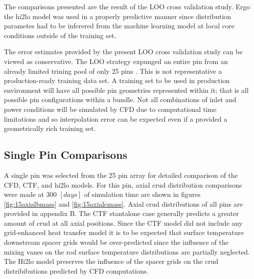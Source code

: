The comparisons presented are the result of the LOO cross validation study.
Ergo the hi2lo model was used in a properly predictive manner since distribution parametes had to be inferered from the machine learning model at local core conditions outside of the training set.

The error estimates provided by the present LOO cross validation study can be viewed as conservative.  The LOO strategy expunged an entire pin from an already limited trining pool of only 25 pins . This is not representative a production-ready training data set.  A training set to be used in production environment will have all possible pin geometries represented within it; that is all possible pin configurations within a bundle.  Not all combinations of inlet and power conditions will be simulated by CFD due to computational time limitations and so interpolation error can be expected even if a provided a geometrically rich training set.  




\subsection{Single Pin Comparisons}
\label{sec:single_pin_result}

A single pin was selected from the 25 pin array for detailed comparison of the CFD, CTF, and hi2lo models.  For this pin, axial crud distribution comparisons were made at 300 $[days]$ of simulation time are shown in figures \ref{fig:15axialbmass} and \ref{fig:15axialcmass}.  Axial crud distributions of all pins are provided in appendix B.  The CTF stantalone case generally predicts a greater amount of crud at all axial positions.  Since the CTF model did not include any grid-enhanced heat transfer model it is to be expected that surface temperature downstream spacer grids would be over-predicted since the influence of the mixing vanes on the rod surface temperature distributions are partially neglected.  The Hi2lo model preserves the influence of the spacer grids on the crud distribibutions predicted by CFD computations.

